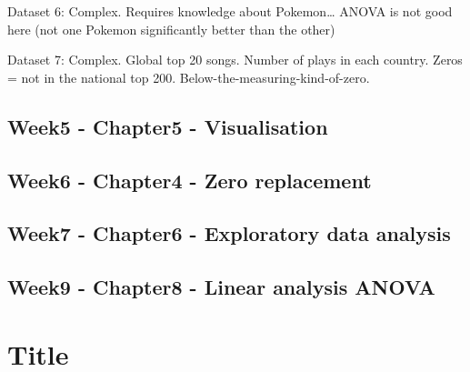 \documentclass{article}
\begin{document}
Dataset 6: Complex. Requires knowledge about Pokemon… ANOVA is not good here (not one Pokemon significantly better than the other)

Dataset 7: Complex. Global top 20 songs. Number of plays in each country. Zeros = not in the national top 200. Below-the-measuring-kind-of-zero.

 
\subsection{Week5 - Chapter5 - Visualisation} 
\subsection{Week6 - Chapter4 - Zero replacement} 
\subsection{Week7 - Chapter6 - Exploratory data analysis } 
\subsection{Week9 - Chapter8 - Linear analysis ANOVA} 


\section{Title}
\end{document}
